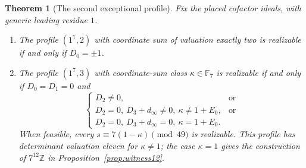 \documentclass[11pt]{amsart}
\theoremstyle{plain}
\newtheorem{theorem}{Theorem}[section]
\theoremstyle{definition}
\numberwithin{equation}{section}
\newcommand{\Z}{\mathbb Z}
\newcommand{\F}{\mathbb F}
\begin{document}
\begin{theorem}[The second exceptional profile]\label{thm:crit11}
Fix the placed cofactor ideals, with generic leading residue $1$.
\begin{enumerate}
\item[(a)] The profile $(1^7,2)$ with coordinate sum of valuation
exactly two is realizable if and only if $D_0=\pm1$.
\item[(b)] The profile $(1^7,3)$ with coordinate-sum class
$\kappa\in\F_7$ is realizable if and only if $D_0=D_1=0$ and
\[
 \begin{cases}
 D_2\ne0, &\text{or}\\
 D_2=0,\ D_3+d_\infty\ne0,\ \kappa\ne1+E_0, &\text{or}\\
 D_2=0,\ D_3+d_\infty=0,\ \kappa=1+E_0.
 \end{cases}
\]
When feasible, every $s\equiv7(1-\kappa)\pmod{49}$ is realizable.
This profile has determinant valuation eleven for $\kappa\ne1$;
the case $\kappa=1$ gives the construction of $7^{12}\Z$ in
Proposition~\ref{prop:witness12}.
\end{enumerate}
\end{theorem}
\end{document}
